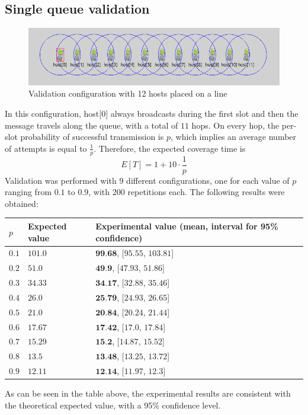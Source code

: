 \subsection{Single queue validation}
\begin{figure}[H]
    \begin{center}
        \includegraphics[scale=0.75]{img/singleQueueGUI.png}
        \caption{Validation configuration with 12 hosts placed on a line}
        \label{fig:single_queueGUI}
    \end{center}
    \vspace*{-0.8cm}
\end{figure}
In this configuration, host[0] always broadcasts during the first slot and then
the message travels along the queue, with a total of $11$ hops. On every hop,
the per-slot probability of successful transmission is $p$, which implies an
average number of attempts is equal to $\frac{1}{p}$. Therefore, the expected
coverage time is
\begin{equation}
    E[T] = 1 + 10 \cdot \frac{1}{p}
    \label{eq:singleQueueValidationAvgT}
\end{equation}
Validation was performed with 9 different configurations, one for  each value
of $p$ ranging from $0.1$ to $0.9$, with 200 repetitions each. The following
results were obtained:
\begin{center}
	\begin{tabular}{ | m{1cm} | m{5cm}| m{5cm} | }
		\hline
		$p$& Expected value & Experimental value (mean, interval for 95\% confidence)\\
		\hline
			$0.1$&$101.0$&$\textbf{99.68}$, [$95.55$, $103.81$]\\
		\hline
			$0.2$&$51.0$&$\textbf{49.9}$, [$47.93$, $51.86$]\\
		\hline
			$0.3$&$34.33$&$\textbf{34.17}$, [$32.88$, $35.46$]\\
		\hline
			$0.4$&$26.0$&$\textbf{25.79}$, [$24.93$, $26.65$]\\
		\hline
			$0.5$&$21.0$&$\textbf{20.84}$, [$20.24$, $21.44$]\\
		\hline
			$0.6$&$17.67$&$\textbf{17.42}$, [$17.0$, $17.84$]\\
		\hline
			$0.7$&$15.29$&$\textbf{15.2}$, [$14.87$, $15.52$]\\
		\hline
			$0.8$&$13.5$&$\textbf{13.48}$, [$13.25$, $13.72$]\\
		\hline
			$0.9$&$12.11$&$\textbf{12.14}$, [$11.97$, $12.3$]\\
		\hline
	\end{tabular}
\end{center}
As can be seen in the table above, the experimental results are consistent with
the theoretical expected value, with a 95\% confidence level.

